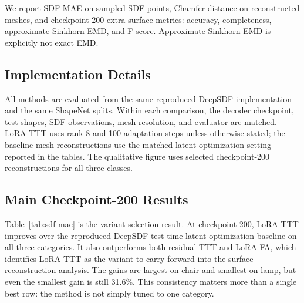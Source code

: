 \documentclass[letterpaper]{article}
\begin{document}
We report SDF-MAE on sampled SDF points, Chamfer distance on reconstructed meshes, and checkpoint-200 extra surface metrics: accuracy, completeness, approximate Sinkhorn EMD, and F-score. Approximate Sinkhorn EMD is explicitly not exact EMD.

\subsection{Implementation Details}

All methods are evaluated from the same reproduced DeepSDF implementation and the same ShapeNet splits. Within each comparison, the decoder checkpoint, test shapes, SDF observations, mesh resolution, and evaluator are matched. LoRA-TTT uses rank 8 and 100 adaptation steps unless otherwise stated; the baseline mesh reconstructions use the matched latent-optimization setting reported in the tables. The qualitative figure uses selected checkpoint-200 reconstructions for all three classes.

\subsection{Main Checkpoint-200 Results}

\begin{table}[t]
\centering
\begin{small}
\end{small}
\caption{Main checkpoint-200 SDF-MAE results on the official-style test splits. Lower is better. LoRA-TTT is the best method in all three categories.}
\label{tab:sdf-mae}
\end{table}

Table~\ref{tab:sdf-mae} is the variant-selection result. At checkpoint 200, LoRA-TTT improves over the reproduced DeepSDF test-time latent-optimization baseline on all three categories. It also outperforms both residual TTT and LoRA-FA, which identifies LoRA-TTT as the variant to carry forward into the surface reconstruction analysis. The gains are largest on chair and smallest on lamp, but even the smallest gain is still 31.6\%. This consistency matters more than a single best row: the method is not simply tuned to one category.
\end{document}
